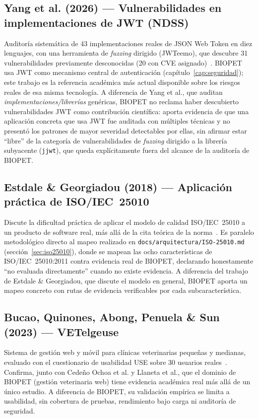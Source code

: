 \subsection{Yang et al. (2026) --- Vulnerabilidades en implementaciones de JWT (NDSS)}
Auditor\'ia sistem\'atica de 43 implementaciones reales de JSON Web Token
en diez lenguajes, con una herramienta de \emph{fuzzing} dirigido
(JWTeemo), que descubre 31 vulnerabilidades previamente desconocidas (20
con CVE asignado)~\cite{yang2026tokentimebomb}. BIOPET usa JWT como
mecanismo central de autenticaci\'on (cap\'itulo~\ref{cap:seguridad}); este
trabajo es la referencia acad\'emica m\'as actual disponible sobre los
riesgos reales de esa misma tecnolog\'ia. A diferencia de Yang et al., que
auditan \emph{implementaciones/librer\'ias} gen\'ericas, BIOPET no reclama
haber descubierto vulnerabilidades JWT como contribuci\'on cient\'ifica:
aporta evidencia de que una aplicaci\'on concreta que usa JWT fue auditada
con m\'ultiples t\'ecnicas y no present\'o los patrones de mayor severidad
detectables por ellas, sin afirmar estar ``libre'' de la categor\'ia de
vulnerabilidades de \emph{fuzzing} dirigido a la librer\'ia subyacente
(\texttt{jjwt}), que queda expl\'icitamente fuera del alcance de la
auditor\'ia de BIOPET.

\subsection{Estdale \& Georgiadou (2018) --- Aplicaci\'on pr\'actica de ISO/IEC~25010}
Discute la dificultad pr\'actica de aplicar el modelo de calidad
ISO/IEC~25010 a un producto de software real, m\'as all\'a de la cita
te\'orica de la norma~\cite{estdale2018applying25010}. Es paralelo
metodol\'ogico directo al mapeo realizado en
\texttt{docs/arquitectura/ISO-25010.md} (secci\'on~\ref{sec:iso25010}),
donde se mapean las ocho caracter\'isticas de ISO/IEC~25010:2011 contra
evidencia real de BIOPET, declarando honestamente ``no evaluada
directamente'' cuando no existe evidencia. A diferencia del trabajo de
Estdale \& Georgiadou, que discute el modelo en general, BIOPET aporta un
mapeo concreto con rutas de evidencia verificables por cada
subcaracter\'istica.

\subsection{Bucao, Quinones, Abong, Penuela \& Sun (2023) --- VETelgeuse}
Sistema de gesti\'on web y m\'ovil para cl\'inicas veterinarias peque\~nas y
medianas, evaluado con el cuestionario de usabilidad USE sobre 30
usuarios reales~\cite{bucao2023vetelgeuse}. Confirma, junto con Cede\~no
Ochoa et al. y Llaneta et al., que el dominio de BIOPET (gesti\'on
veterinaria web) tiene evidencia acad\'emica real m\'as all\'a de un
\'unico estudio. A diferencia de BIOPET, su validaci\'on emp\'irica se
limita a usabilidad, sin cobertura de pruebas, rendimiento bajo carga ni
auditor\'ia de seguridad.

